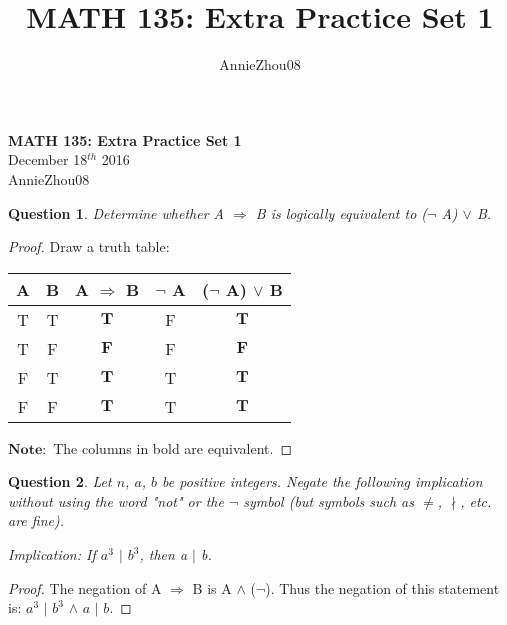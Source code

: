\documentclass[11pt,oneside]{article}
\title{MATH 135: Extra Practice Set 1}
\author{AnnieZhou08}
\newtheorem{question}{Question}
\begin{document}
\begin{center}
    \textbf{MATH 135: Extra Practice Set 1} \\
    December 18$^{th}$ 2016 \\

    AnnieZhou08
\end{center}

\bigskip

\begin{question}
    Determine whether A $\Rightarrow$ B is logically equivalent to ($\neg$ A) $\lor$ B. 
\end{question}

\begin{proof}
    Draw a truth table:
	    \begin{center}
	    	\begin{tabular}{c|c|c|c|c}
	    		\hline
	    		A & B & A $\Rightarrow$ B & $\neg$ A & ($\neg$ A) $\lor$ B \\
	    		\hline
	    		T & T & $\mathbf{T}$ & F & $\mathbf{T}$\\
	    		T & F & $\mathbf{F}$ & F & $\mathbf{F}$\\
	    		F & T & $\mathbf{T}$ & T & $\mathbf{T}$\\
	    		F & F & $\mathbf{T}$ & T & $\mathbf{T}$\\
	    	\end{tabular}
	    \end{center}
	$\mathbf{Note:}$ The columns in bold are equivalent.
        
    
\end{proof}

\bigskip

\begin{question}
    Let $n$, $a$, $b$ be positive integers. Negate the following implication without using the word "not" or the $\neg$ symbol (but symbols such as $\neq$, $\nmid$, etc. are fine). 
    \begin{center}
    	Implication: If $a^3$ $\mid$ $b^3$, then a $\mid$ b.\\
    \end{center}
\end{question}

\begin{proof}
	The negation of A $\Rightarrow$ B is A $\land$ ($\neg$). Thus the negation of this statement is: $a^3$ $\mid$ $b^3$ $\land$ $a$ $\mid$ $b$.
\end{proof}

\newpage
\end{document}
